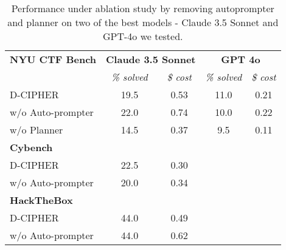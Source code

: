 \begin{table}[htbp]
    \centering
    \small
    \caption{Performance under ablation study by removing autoprompter and planner on two of the best models - Claude 3.5 Sonnet and GPT-4o we tested.}
    \label{tab:ablation_study}
    \begin{tabular}{lcccc}
        \toprule
        \textbf{NYU CTF Bench} & \multicolumn{2}{c}{\textbf{Claude 3.5 Sonnet}} & \multicolumn{2}{c}{\textbf{GPT 4o}} \\
         & \textit{\% solved} & \textit{\$ cost} & \textit{\% solved} & \textit{\$ cost} \\
        \midrule
        D-CIPHER & 19.5 & 0.53 & 11.0 & 0.21 \\
        w/o Auto-prompter &22.0  &0.74   &10.0  &0.22  \\
        w/o Planner  &14.5 &0.37  &9.5  &0.11  \\
        \midrule
        \textbf{Cybench} & & & & \\
        \midrule
        D-CIPHER & 22.5 & 0.30 &  & \\
        w/o Auto-prompter & 20.0 &0.34   &  &  \\
        \midrule
        \textbf{HackTheBox} & & & & \\
        \midrule
        D-CIPHER & 44.0 & 0.49 &  &  \\
        w/o Auto-prompter & 44.0  & 0.62   &  &  \\
        \bottomrule
    \end{tabular}
    
\end{table}

